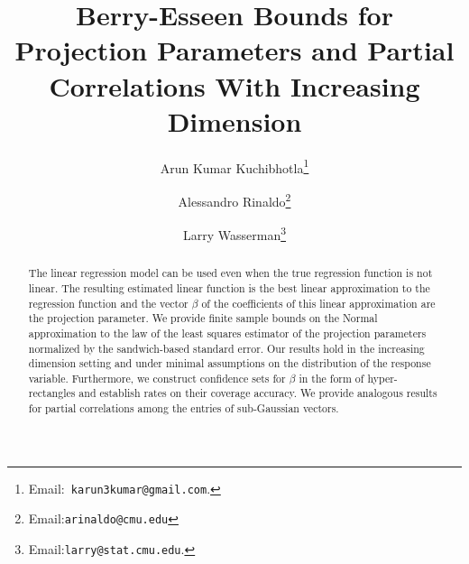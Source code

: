 \documentclass{article}
\title{\bf Berry-Esseen Bounds for Projection Parameters and Partial Correlations With Increasing Dimension}
\author{
     Arun Kumar Kuchibhotla\thanks{Email:{\tt
             karun3kumar@gmail.com}.}
     \and
     Alessandro Rinaldo\thanks{Email:{\tt arinaldo@cmu.edu}}
     \and
     Larry Wasserman\thanks{Email:{\tt larry@stat.cmu.edu}.}
 	
 }
\begin{document}
 
 
 
 
 
 
 
 
 
 
 
 
 
 
 
 
 
 
 
 
 
 
 
 
 
 
 
 
 
 
 
 
 
 
 
 \begin{abstract}
 The linear regression model can be used even when
 the true regression function is not linear.
 The resulting estimated linear function is the best linear
 approximation to the regression function and
 the vector $\beta$ of the coefficients of this linear approximation
 are the projection parameter.
 We provide finite sample bounds
 on the Normal approximation to the law of
 the least squares estimator of the projection parameters
 normalized by the sandwich-based standard error. Our results hold in the increasing dimension setting and under minimal assumptions on the distribution of the response variable.
 Furthermore, we construct confidence sets 
 for $\beta$ in the form of hyper-rectangles and establish rates on their coverage accuracy.
 We provide analogous results for partial correlations among the entries of sub-Gaussian vectors. 
 \end{abstract}
 
 
 
 
 
 
 
 
 
 
 
 
 
 
 
 
 
 
 
\end{document}
